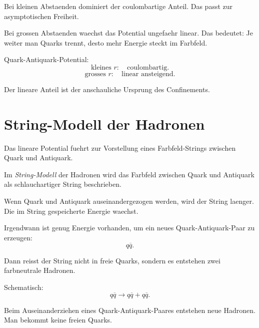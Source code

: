 \begin{conceptbox}
Bei kleinen Abstaenden dominiert der coulombartige Anteil.
Das passt zur asymptotischen Freiheit.

Bei grossen Abstaenden waechst das Potential ungefaehr linear.
Das bedeutet:
Je weiter man Quarks trennt, desto mehr Energie steckt im Farbfeld.
\end{conceptbox}

\begin{examtipbox}
Quark-Antiquark-Potential:
\[
    \text{kleines } r:
    \quad
    \text{coulombartig}.
\]
\[
    \text{grosses } r:
    \quad
    \text{linear ansteigend}.
\]

Der lineare Anteil ist der anschauliche Ursprung des Confinements.
\end{examtipbox}

\section{String-Modell der Hadronen}

Das lineare Potential fuehrt zur Vorstellung eines Farbfeld-Strings zwischen Quark
und Antiquark.

\begin{definitionbox}
Im \emph{String-Modell} der Hadronen wird das Farbfeld zwischen Quark und Antiquark
als schlauchartiger String beschrieben.
\end{definitionbox}

\begin{conceptbox}
Wenn Quark und Antiquark auseinandergezogen werden, wird der String laenger.
Die im String gespeicherte Energie waechst.

Irgendwann ist genug Energie vorhanden, um ein neues Quark-Antiquark-Paar zu erzeugen:
\[
    q\overline{q}.
\]

Dann reisst der String nicht in freie Quarks, sondern es entstehen zwei farbneutrale
Hadronen.
\end{conceptbox}

\begin{formulabox}
Schematisch:
\[
    q\overline{q}
    \rightarrow
    q\overline{q}
    +
    q\overline{q}.
\]
\end{formulabox}

\begin{examtipbox}
Beim Auseinanderziehen eines Quark-Antiquark-Paares entstehen neue Hadronen.
Man bekommt keine freien Quarks.
\end{examtipbox}

